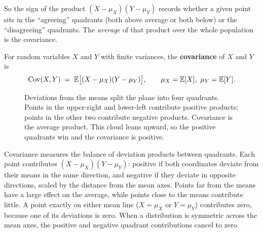 So the sign of the product $(X-\mu_X)(Y-\mu_Y)$ records whether a given point sits
in the ``agreeing'' quadrants (both above average or both below) or the ``disagreeing''
quadrants. The \emph{average} of that product over the whole population is the
covariance.

\begin{definition}[Covariance]
\label{ch14:def-cov}
For random variables $X$ and $Y$ with finite variances, the \textbf{covariance} of
$X$ and $Y$ is
\[
\operatorname{Cov}(X, Y) \;=\; \operatorname{\mathbb{E}}\!\big[(X - \mu_X)(Y - \mu_Y)\big],
\qquad \mu_X = \operatorname{\mathbb{E}}[X],\ \mu_Y = \operatorname{\mathbb{E}}[Y].
\]
\end{definition}

\begin{figure}[H]
\centering
{}
\caption{Deviations from the means split the plane into four quadrants. Points in
the upper-right and lower-left contribute positive products; points in the other
two contribute negative products. Covariance is the average product. This cloud
leans upward, so the positive quadrants win and the covariance is positive.}
\label{ch14:fig-quadrants}
\end{figure}

\begin{happeningbox}
Covariance measures the balance of deviation products between quadrants. Each point
contributes $(X - \mu_X)(Y - \mu_Y)$: positive if both coordinates deviate from their
means in the same direction, and negative if they deviate in opposite directions,
scaled by the distance from the mean axes. Points far from the means have a large
effect on the average, while points close to the means contribute little. A point
exactly on either mean line ($X = \mu_X$ or $Y = \mu_Y$) contributes zero,
because one of its deviations is zero. When a distribution is symmetric across
the mean axes, the positive and negative quadrant contributions cancel to zero.
\end{happeningbox}

